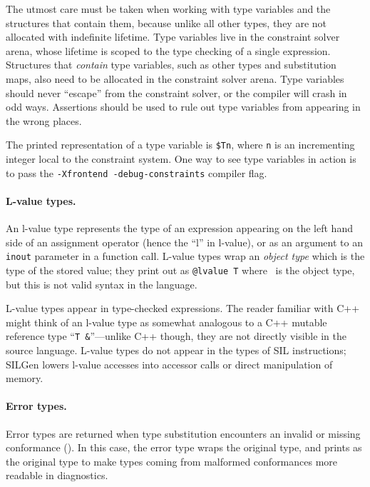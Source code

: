 \documentclass[../generics]{subfiles}
\begin{document}
The utmost care must be taken when working with type variables and the structures that contain them, because unlike all other types, they are not allocated with indefinite lifetime. Type variables live in the constraint solver arena, whose lifetime is scoped to the type checking of a single expression. Structures that \emph{contain} type variables, such as other types and substitution maps, also need to be allocated in the constraint solver arena. Type variables should never ``escape'' from the constraint solver, or the compiler will crash in odd ways. Assertions should be used to rule out type variables from appearing in the wrong places.

The printed representation of a type variable is \texttt{\$Tn}, where \texttt{n} is an incrementing integer local to the constraint system. One way to see type variables in action is to pass the \texttt{-Xfrontend~-debug-constraints} compiler flag.

\paragraph{L-value types.}
An l-value type represents the type of an expression appearing on the left hand side of an assignment operator (hence the ``l'' in l-value), or as an argument to an \texttt{inout} parameter in a function call. L-value types wrap an \emph{object type} which is the type of the stored value; they print out as \verb|@lvalue T| where \tT\ is the object type, but this is not valid syntax in the language.

L-value types appear in type-checked expressions. The reader familiar with C++ might think of an l-value type as somewhat analogous to a C++ mutable reference type ``\verb|T &|''---unlike C++ though, they are not directly visible in the source language. L-value types do not appear in the types of SIL instructions; SILGen lowers l-value accesses into accessor calls or direct manipulation of memory.

\paragraph{Error types.}
Error types are returned when type substitution encounters an invalid or missing conformance (). In this case, the error type wraps the original type, and prints as the original type to make types coming from malformed conformances more readable in diagnostics.
\end{document}
